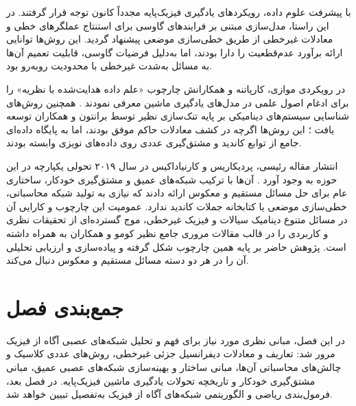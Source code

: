 با پیشرفت علوم داده، رویکردهای یادگیری فیزیک‌پایه مجدداً کانون توجه قرار گرفتند. در این راستا، مدل‌سازی مبتنی بر فرایندهای گاوسی برای استنتاج عملگرهای خطی \cite{raissi2017a} و معادلات غیرخطی از طریق خطی‌سازی موضعی \cite{raissi2018} پیشنهاد گردید. این روش‌ها توانایی ارائه برآورد عدم‌قطعیت را دارا بودند، اما به‌دلیل فرضیات گاوسی، قابلیت تعمیم آن‌ها به مسائل به‌شدت غیرخطی با محدودیت روبه‌رو بود.

در رویکردی موازی، کارپاتنه و همکارانش چارچوب «علم داده هدایت‌شده با نظریه» را برای ادغام اصول علمی در مدل‌های یادگیری ماشین معرفی نمودند \cite{karpatne2017}. همچنین روش‌های شناسایی سیستم‌های دینامیکی بر پایه تنک‌سازی نظیر  توسط برانتون و همکاران توسعه یافت \cite{sindy2016}؛ این روش‌ها اگرچه در کشف معادلات حاکم موفق بودند، اما به پایگاه داده‌ای جامع از توابع کاندید و مشتق‌گیری عددی روی داده‌های نویزی وابسته بودند.

انتشار مقاله رئیسی، پردیکاریس و کارنیاداکیس در سال ۲۰۱۹ تحولی یکپارچه در این حوزه به وجود آورد \cite{raissi2019}. آن‌ها با ترکیب شبکه‌های عمیق و مشتق‌گیری خودکار، ساختاری عام برای حل مسائل مستقیم و معکوس ارائه دادند که نیازی به تولید شبکه محاسباتی، خطی‌سازی موضعی یا کتابخانه جملات کاندید ندارد. عمومیت این چارچوب و کارایی آن در مسائل متنوع دینامیک سیالات و فیزیک غیرخطی، موج گسترده‌ای از تحقیقات نظری و کاربردی را در قالب مقالات مروری جامع نظیر کومو و همکاران \cite{cuomo2022} به همراه داشته است. پژوهش حاضر بر پایه همین چارچوب شکل گرفته و پیاده‌سازی و ارزیابی تحلیلی آن را در هر دو دسته مسائل مستقیم و معکوس دنبال می‌کند.

\section{جمع‌بندی فصل}
\label{sec:ch2-summary}

در این فصل، مبانی نظری مورد نیاز برای فهم و تحلیل شبکه‌های عصبی آگاه از فیزیک مرور شد: تعاریف و معادلات دیفرانسیل جزئی غیرخطی، روش‌های عددی کلاسیک و چالش‌های محاسباتی آن‌ها، مبانی ساختار و بهینه‌سازی شبکه‌های عصبی عمیق، مبانی مشتق‌گیری خودکار و تاریخچه تحولات یادگیری ماشین فیزیک‌پایه. در فصل بعد، فرمول‌بندی ریاضی و الگوریتمی شبکه‌های آگاه از فیزیک به‌تفصیل تبیین خواهد شد.
